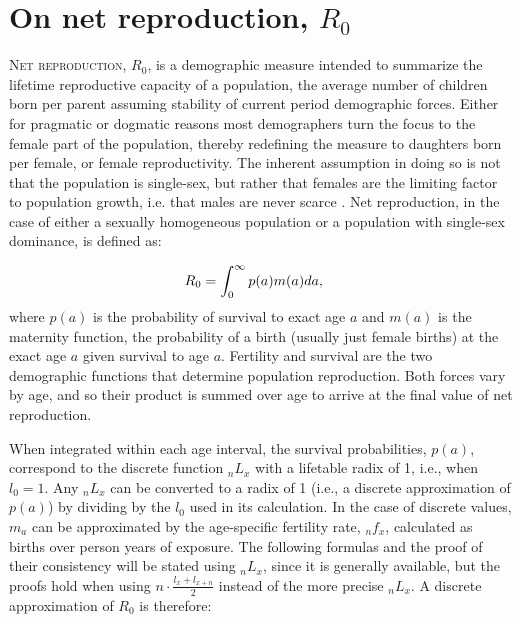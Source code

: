 \documentclass{article}
\begin{document}
\section*{On net reproduction, $R_{0}$}
\textsc{Net reproduction}, $R_{0}$, is a demographic measure intended to
summarize the lifetime reproductive capacity of a population, the average number
of children born per parent \citep{kuczynski1932fertility} assuming stability of
current period demographic forces. Either for pragmatic or dogmatic reasons most
demographers turn the focus to the female part of the population, thereby redefining the measure to daughters born per female, or female reproductivity. The inherent assumption in doing so is not that the population is single-sex, but rather that females are the limiting factor to population growth, i.e. that males are never scarce \citep{keyfitz2005applied}. Net reproduction, in the case of either a sexually homogeneous population or a population with single-sex dominance, is defined as:

\begin{align}
R_{0} &= \int_{0}^{\infty}p(a)m(a)da \notag \text{,}
\end{align}
where $p(a)$ is the probability of survival to exact age $a$ and $m(a)$ is the
maternity function, the probability of a birth (usually just female births) at
the exact age $a$ given survival to age $a$. Fertility and survival are the two
demographic functions that determine population reproduction. Both forces vary
by age, and so their product is summed over age to arrive at the final value of
net reproduction. 

When integrated within each age interval, the survival probabilities, $p(a)$,
correspond to the discrete function ${}_{n}L_{x}$ with a lifetable radix of 1,
i.e., when $l_{0} = 1$. Any ${}_{n}L_{x}$ can be converted to a radix of 1 (i.e.,
a discrete approximation of $p(a)$) by dividing by the $l_{0}$ used in its calculation. In
the case of discrete values, $m_{a}$ can be approximated by the age-specific
fertility rate, ${}_{n}f_{x}$, calculated as births over person years of exposure.
The following formulas and the proof of their consistency will be stated using
${}_{n}L_{x}$, since it is generally available, but the proofs hold when using
$n\cdot\frac{l_{x}+l_{x+n}}{2}$ instead of the more precise ${}_{n}L_{x}$. A
discrete approximation of $R_{0}$ is therefore:
\end{document}
